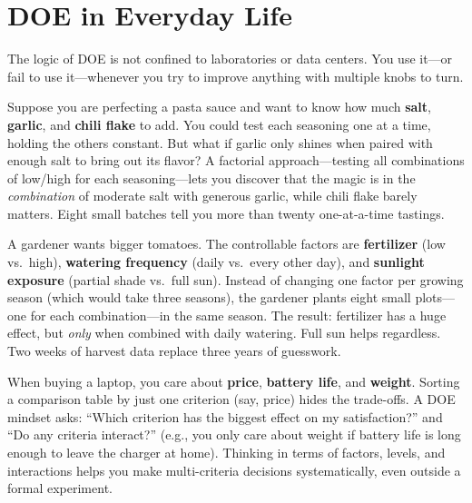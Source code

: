 \documentclass[11pt]{book}
\begin{document}
\section{DOE in Everyday Life}

The logic of DOE is not confined to laboratories or data centers. You use it---or
fail to use it---whenever you try to improve anything with multiple knobs to turn.

\begin{example}
Suppose you are perfecting a pasta sauce and want to know how much \textbf{salt},
\textbf{garlic}, and \textbf{chili flake} to add. You could test each seasoning
one at a time, holding the others constant. But what if garlic only shines when
paired with enough salt to bring out its flavor? A factorial approach---testing
all combinations of low/high for each seasoning---lets you discover that the
magic is in the \emph{combination} of moderate salt with generous garlic, while
chili flake barely matters. Eight small batches tell you more than twenty
one-at-a-time tastings.
\end{example}

\begin{example}
A gardener wants bigger tomatoes. The controllable factors are
\textbf{fertilizer} (low vs.\ high), \textbf{watering frequency}
(daily vs.\ every other day), and \textbf{sunlight exposure} (partial shade
vs.\ full sun). Instead of changing one factor per growing season (which would
take three seasons), the gardener plants eight small plots---one for each
combination---in the same season. The result: fertilizer has a huge effect, but
\emph{only} when combined with daily watering. Full sun helps regardless. Two
weeks of harvest data replace three years of guesswork.
\end{example}

\begin{example}
When buying a laptop, you care about \textbf{price}, \textbf{battery life}, and
\textbf{weight}. Sorting a comparison table by just one criterion (say, price)
hides the trade-offs. A DOE mindset asks: ``Which criterion has the biggest
effect on my satisfaction?'' and ``Do any criteria interact?'' (e.g., you
only care about weight if battery life is long enough to leave the charger at
home). Thinking in terms of factors, levels, and interactions helps you make
multi-criteria decisions systematically, even outside a formal experiment.
\end{example}
\end{document}

